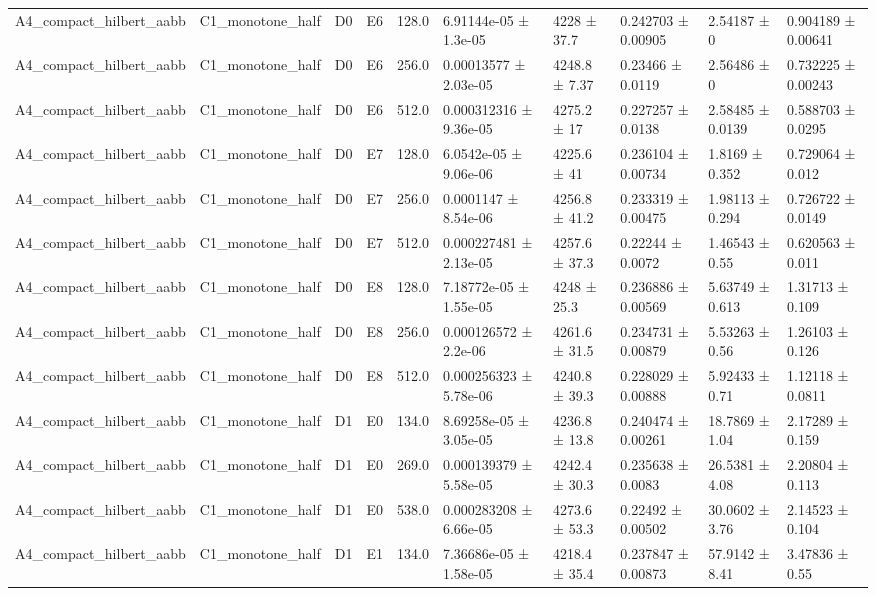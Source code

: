 \begin{table}
\begin{tabular}{llllllllll}
A4\_compact\_hilbert\_aabb & C1\_monotone\_half & D0 & E6 & 128.0 & 6.91144e-05 ± 1.3e-05 & 4228 ± 37.7 & 0.242703 ± 0.00905 & 2.54187 ± 0 & 0.904189 ± 0.00641 \\
A4\_compact\_hilbert\_aabb & C1\_monotone\_half & D0 & E6 & 256.0 & 0.00013577 ± 2.03e-05 & 4248.8 ± 7.37 & 0.23466 ± 0.0119 & 2.56486 ± 0 & 0.732225 ± 0.00243 \\
A4\_compact\_hilbert\_aabb & C1\_monotone\_half & D0 & E6 & 512.0 & 0.000312316 ± 9.36e-05 & 4275.2 ± 17 & 0.227257 ± 0.0138 & 2.58485 ± 0.0139 & 0.588703 ± 0.0295 \\
A4\_compact\_hilbert\_aabb & C1\_monotone\_half & D0 & E7 & 128.0 & 6.0542e-05 ± 9.06e-06 & 4225.6 ± 41 & 0.236104 ± 0.00734 & 1.8169 ± 0.352 & 0.729064 ± 0.012 \\
A4\_compact\_hilbert\_aabb & C1\_monotone\_half & D0 & E7 & 256.0 & 0.0001147 ± 8.54e-06 & 4256.8 ± 41.2 & 0.233319 ± 0.00475 & 1.98113 ± 0.294 & 0.726722 ± 0.0149 \\
A4\_compact\_hilbert\_aabb & C1\_monotone\_half & D0 & E7 & 512.0 & 0.000227481 ± 2.13e-05 & 4257.6 ± 37.3 & 0.22244 ± 0.0072 & 1.46543 ± 0.55 & 0.620563 ± 0.011 \\
A4\_compact\_hilbert\_aabb & C1\_monotone\_half & D0 & E8 & 128.0 & 7.18772e-05 ± 1.55e-05 & 4248 ± 25.3 & 0.236886 ± 0.00569 & 5.63749 ± 0.613 & 1.31713 ± 0.109 \\
A4\_compact\_hilbert\_aabb & C1\_monotone\_half & D0 & E8 & 256.0 & 0.000126572 ± 2.2e-06 & 4261.6 ± 31.5 & 0.234731 ± 0.00879 & 5.53263 ± 0.56 & 1.26103 ± 0.126 \\
A4\_compact\_hilbert\_aabb & C1\_monotone\_half & D0 & E8 & 512.0 & 0.000256323 ± 5.78e-06 & 4240.8 ± 39.3 & 0.228029 ± 0.00888 & 5.92433 ± 0.71 & 1.12118 ± 0.0811 \\
A4\_compact\_hilbert\_aabb & C1\_monotone\_half & D1 & E0 & 134.0 & 8.69258e-05 ± 3.05e-05 & 4236.8 ± 13.8 & 0.240474 ± 0.00261 & 18.7869 ± 1.04 & 2.17289 ± 0.159 \\
A4\_compact\_hilbert\_aabb & C1\_monotone\_half & D1 & E0 & 269.0 & 0.000139379 ± 5.58e-05 & 4242.4 ± 30.3 & 0.235638 ± 0.0083 & 26.5381 ± 4.08 & 2.20804 ± 0.113 \\
A4\_compact\_hilbert\_aabb & C1\_monotone\_half & D1 & E0 & 538.0 & 0.000283208 ± 6.66e-05 & 4273.6 ± 53.3 & 0.22492 ± 0.00502 & 30.0602 ± 3.76 & 2.14523 ± 0.104 \\
A4\_compact\_hilbert\_aabb & C1\_monotone\_half & D1 & E1 & 134.0 & 7.36686e-05 ± 1.58e-05 & 4218.4 ± 35.4 & 0.237847 ± 0.00873 & 57.9142 ± 8.41 & 3.47836 ± 0.55 \\

\end{tabular}
\end{table}
